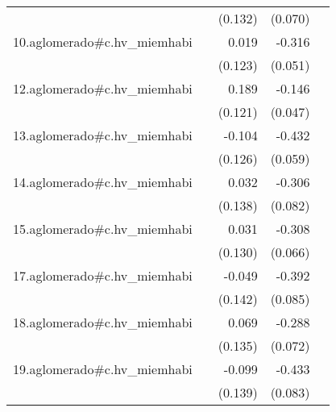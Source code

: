 {\begin{longtable}{l*{4}{D{.}{.}{-1}}}
            &                     &     (0.132)         &     (0.070)         &                     \\
\addlinespace
10.aglomerado#c.hv\_miemhabi&                     &       0.019         &      -0.316\sym{***}&                     \\
            &                     &     (0.123)         &     (0.051)         &                     \\
\addlinespace
12.aglomerado#c.hv\_miemhabi&                     &       0.189         &      -0.146\sym{**} &                     \\
            &                     &     (0.121)         &     (0.047)         &                     \\
\addlinespace
13.aglomerado#c.hv\_miemhabi&                     &      -0.104         &      -0.432\sym{***}&                     \\
            &                     &     (0.126)         &     (0.059)         &                     \\
\addlinespace
14.aglomerado#c.hv\_miemhabi&                     &       0.032         &      -0.306\sym{***}&                     \\
            &                     &     (0.138)         &     (0.082)         &                     \\
\addlinespace
15.aglomerado#c.hv\_miemhabi&                     &       0.031         &      -0.308\sym{***}&                     \\
            &                     &     (0.130)         &     (0.066)         &                     \\
\addlinespace
17.aglomerado#c.hv\_miemhabi&                     &      -0.049         &      -0.392\sym{***}&                     \\
            &                     &     (0.142)         &     (0.085)         &                     \\
\addlinespace
18.aglomerado#c.hv\_miemhabi&                     &       0.069         &      -0.288\sym{***}&                     \\
            &                     &     (0.135)         &     (0.072)         &                     \\
\addlinespace
19.aglomerado#c.hv\_miemhabi&                     &      -0.099         &      -0.433\sym{***}&                     \\
            &                     &     (0.139)         &     (0.083)         &                     \\

\end{longtable}}
